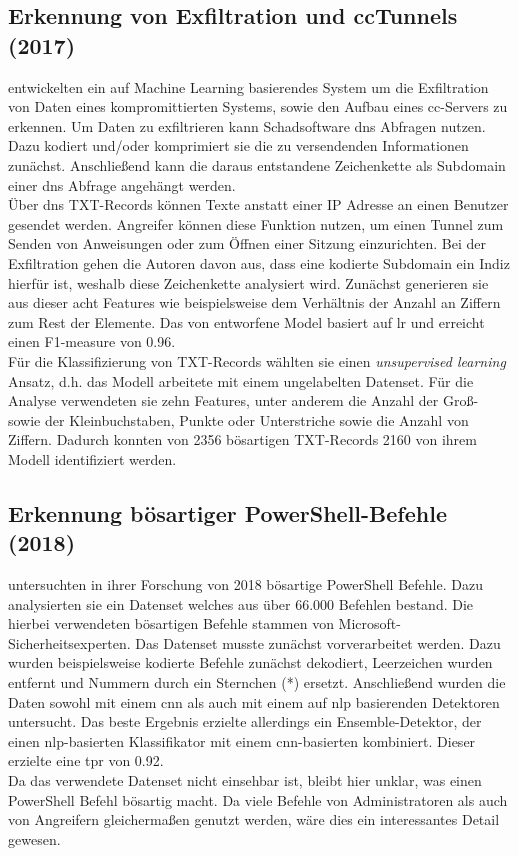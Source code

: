 \documentclass[
    12pt, %
    DIV10,
    ngerman, %
    a4paper, %
    oneside, %
    titlepage, %
    parskip=half, %
    headings=normal, %
    listof=totoc, %
    bibliography=totoc, %
    index=totoc, %
    captions=tableheading, %
    final %
]{scrreprt}
\begin{document}
\subsection{Erkennung von Exfiltration und \ac{cc}Tunnels (2017)}
\textcite{Das2018} entwickelten ein auf Machine Learning basierendes System um die Exfiltration von Daten eines kompromittierten Systems, sowie den Aufbau eines \ac{cc}-Servers zu erkennen. Um Daten zu exfiltrieren kann Schadsoftware \ac{dns} Abfragen nutzen. Dazu kodiert und/oder komprimiert sie die zu versendenden Informationen zunächst. Anschließend kann die daraus entstandene Zeichenkette als Subdomain einer \ac{dns} Abfrage angehängt werden.\\
Über \ac{dns} TXT-Records können Texte anstatt einer IP Adresse an einen Benutzer gesendet werden. Angreifer können diese Funktion nutzen, um einen Tunnel zum Senden von Anweisungen oder zum Öffnen einer Sitzung einzurichten.
Bei der Exfiltration gehen die Autoren davon aus, dass eine kodierte Subdomain ein Indiz hierfür ist, weshalb diese Zeichenkette analysiert wird. Zunächst generieren sie aus dieser acht Features wie beispielsweise dem Verhältnis der Anzahl an Ziffern zum Rest der Elemente. Das von \textcite{Das2018} entworfene Model basiert auf \acl{lr} und erreicht einen F1-measure von 0.96.\\
Für die Klassifizierung von TXT-Records wählten sie einen \emph{unsupervised learning} Ansatz, d.h. das Modell arbeitete mit einem ungelabelten Datenset. Für die Analyse verwendeten sie zehn Features, unter anderem die Anzahl der Groß- sowie der Kleinbuchstaben, Punkte oder Unterstriche sowie die Anzahl von Ziffern. Dadurch konnten von 2356 bösartigen TXT-Records 2160 von ihrem Modell identifiziert werden.
%
\subsection{Erkennung bösartiger PowerShell-Befehle (2018)}
\textcite{Hendler2018} untersuchten in ihrer Forschung von 2018 bösartige PowerShell Befehle. Dazu analysierten sie ein Datenset welches aus über 66.000 Befehlen bestand. Die hierbei verwendeten bösartigen Befehle stammen von Microsoft-Sicherheitsexperten.  Das Datenset musste zunächst vorverarbeitet werden. Dazu wurden beispielsweise kodierte Befehle zunächst dekodiert, Leerzeichen wurden entfernt und Nummern durch ein Sternchen (*) ersetzt. Anschließend wurden die Daten sowohl mit einem \ac{cnn} als auch mit einem auf \ac{nlp} basierenden Detektoren untersucht. Das beste Ergebnis erzielte allerdings ein Ensemble-Detektor, der einen \ac{nlp}-basierten Klassifikator mit einem \ac{cnn}-basierten kombiniert. Dieser erzielte eine \ac{tpr} von 0.92.\\
Da das verwendete Datenset nicht einsehbar ist, bleibt hier unklar, was einen PowerShell Befehl bösartig macht. Da viele Befehle von Administratoren als auch von Angreifern gleichermaßen genutzt werden, wäre dies ein interessantes Detail gewesen.
%
\end{document}
